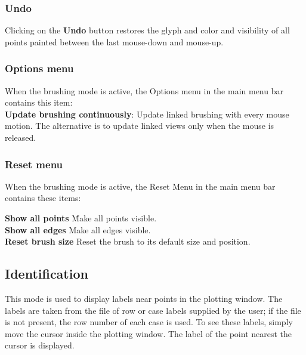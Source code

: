 \documentclass[11pt]{article}
\begin{document}
\subsubsection{Undo}
%
Clicking on the {\bf Undo} button restores the glyph and color and
visibility of all points painted between the last mouse-down and
mouse-up.

\subsubsection{Options menu}
%
When the brushing mode is active, the Options menu in the main
menu bar contains this item:
\medskip
\noindent
\\{\bf Update brushing continuously}: Update linked
  brushing with every mouse motion.  The alternative is to update linked
  views only when the mouse is released.

\subsubsection{Reset menu}
%
When the brushing mode is active, the Reset Menu in the main
menu bar contains these items:

\begin{tabbing}
 {\bf Show all points} \hspace{.5in} \= Make all points visible. \\
 {\bf Show all edges} \> Make all edges visible. \\
 {\bf Reset brush size} \> Reset the brush to its default size and position. \\
\end{tabbing}
%

\subsection{Identification}
\label{slbl:Identify}

This mode is used to display labels near points in the plotting
window.  The labels are taken from the file of row or case labels
supplied by the user; if the file is not present, the row number of
each case is used.  To see these labels, simply move the cursor
inside the plotting window.  The label of the point nearest the
cursor is displayed.
\end{document}
